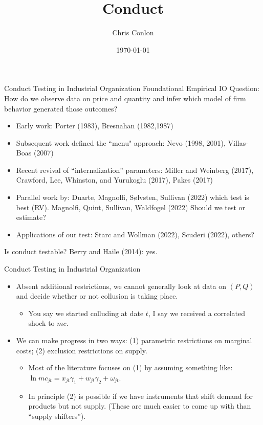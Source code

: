 \documentclass[aspectratio=169,10pt]{beamer}
\begin{document}
\title{Conduct}
\author{Chris Conlon}
\date{\today}

\frame{\titlepage}


\begin{frame}[plain]{Conduct Testing in Industrial Organization}
Foundational Empirical IO Question: How do we observe data on price and quantity and infer which model of firm behavior generated those outcomes?
\pause
\begin{itemize}
\item Early work: Porter (1983), Bresnahan (1982,1987)
\item Subsequent work defined the ``menu" approach: Nevo (1998, 2001), Villas-Boas (2007) 
\item Recent revival of ``internalization'' parameters: Miller and Weinberg (2017), Crawford, Lee, Whinston, and Yurukoglu (2017), Pakes (2017)
\item Parallel work by: Duarte, Magnolfi, Sølvsten, Sullivan (2022) which test is best (RV). Magnolfi, Quint, Sullivan, Waldfogel (2022) Should we test or estimate?
\item Applications of our test: Starc and Wollman (2022), Scuderi (2022), others?
\end{itemize}
Is conduct testable? Berry and Haile (2014): yes.
\end{frame}


\begin{frame}{Conduct Testing in Industrial Organization}
\begin{itemize}
\item Absent additional restrictions, we cannot generally look at data on $(P,Q)$ and decide whether or not collusion is taking place.
\begin{itemize}
\item You say we started colluding at date $t$, I say we received a correlated shock to $mc$.
\end{itemize}
\item We can make progress in two ways: (1) parametric restrictions on marginal costs; (2) exclusion restrictions on supply.
\begin{itemize}
\item Most of the literature focuses on (1) by assuming something like: $\ln mc_{jt} = x_{jt} \gamma_1 + w_{jt} \gamma_2 + \omega_{jt}$.
\item In principle (2) is possible if we have instruments that shift demand for products but not supply. (These are much easier to come up with than ``supply shifters'').
\end{itemize}
\end{itemize}
\end{frame}
\end{document}
